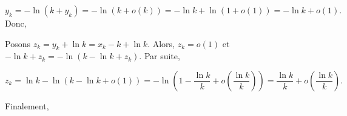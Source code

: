 {\begin{enumerate}
{$$y_k=-\ln(k+y_k)=-\ln(k+o(k))=-\ln k+\ln(1+o(1))=-\ln k+o(1).$$
Donc,

\begin{center}
\end{center}
Posons $z_k=y_k+\ln k=x_k-k+\ln k$. Alors, $z_k=o(1)$ et $-\ln k+z_k=-\ln(k-\ln k+z_k)$. Par suite,

$$z_k=\ln k-\ln(k-\ln k+o(1))=-\ln\left(1-\frac{\ln k}{k}+o\left(\frac{\ln k}{k}\right)\right)=\frac{\ln k}{k}+o\left(\frac{\ln k}{k}\right).$$

Finalement,

\begin{center}
\end{center}}
\end{enumerate}
}

